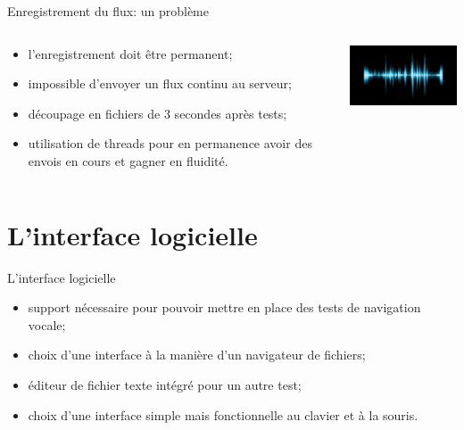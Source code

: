 \documentclass{beamer}
\begin{document}
\begin{frame}{Enregistrement du flux: un problème}

	
	\begin{columns}[c]
	
	\begin{column}{5cm}
	\begin{itemize}
		\item l'enregistrement doit être permanent;
		\item impossible d'envoyer un flux continu au serveur;
		\item découpage en fichiers de 3 secondes après tests;
		\item utilisation de threads pour en permanence avoir des envois en cours et gagner en fluidité.
	\end{itemize}
  	\end{column}
	\begin{column}{5cm}
		\includegraphics[width=5cm]{reconnaissance-vocale}
  	\end{column}
	
	\end{columns}

\end{frame}

	\section{L'interface logicielle}
	
\begin{frame}{L'interface logicielle}

	\begin{itemize}
		\item support nécessaire pour pouvoir mettre en place des tests de navigation vocale;
		\item choix d'une interface à la manière d'un navigateur de fichiers;
		\item éditeur de fichier texte intégré pour un autre test;
		\item choix d'une interface simple mais fonctionnelle au clavier et à la souris.
	\end{itemize}
	
\end{frame}




	
\end{document}
